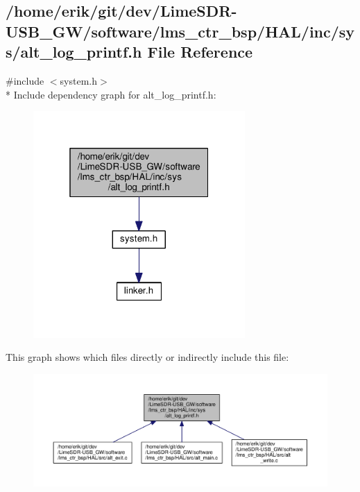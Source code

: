 \subsection{/home/erik/git/dev/\+Lime\+S\+D\+R-\/\+U\+S\+B\+\_\+\+G\+W/software/lms\+\_\+ctr\+\_\+bsp/\+H\+A\+L/inc/sys/alt\+\_\+log\+\_\+printf.h File Reference}
\label{alt__log__printf_8h}
{\ttfamily \#include $<$system.\+h$>$}\\*
Include dependency graph for alt\+\_\+log\+\_\+printf.\+h\+:
\nopagebreak
\begin{figure}[H]
\begin{center}
\leavevmode
\includegraphics[width=229pt]{d8/dd1/alt__log__printf_8h__incl}
\end{center}
\end{figure}
This graph shows which files directly or indirectly include this file\+:
\nopagebreak
\begin{figure}[H]
\begin{center}
\leavevmode
\includegraphics[width=350pt]{d5/d83/alt__log__printf_8h__dep__incl}
\end{center}
\end{figure}
